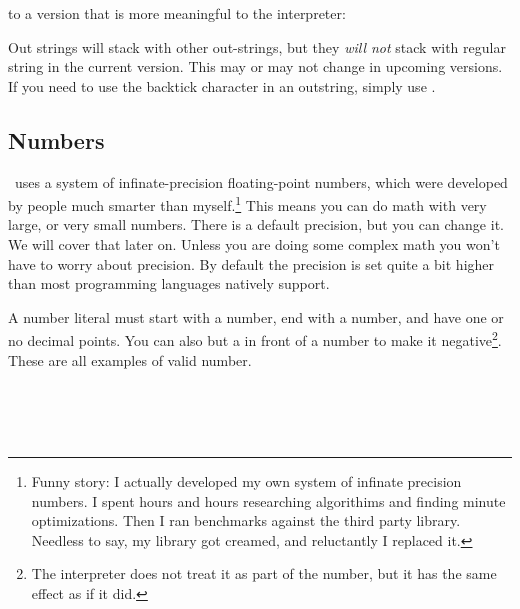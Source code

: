 \documentclass{book}
\begin{document}
\begin{SSCodeBox}
\end{SSCodeBox}

to a version that is more meaningful to the interpreter:

\begin{SSCodeBox}
\scitea{(}
\scitea{+= }
\scitea{)}
\end{SSCodeBox}

Out strings will stack with other out-strings, but they \emph{will not} stack with regular string in the current version.  This may or may not change in upcoming versions.  If you need to use the backtick character in an outstring, simply use \SSCode{\textbackslash\`{}}.



\subsection{Numbers}
\SSquared\ uses a system of infinate-precision floating-point numbers, which were developed by people much smarter than myself.\footnote{Funny story: I actually developed my own system of infinate precision numbers.  I spent hours and hours researching algorithims and finding minute optimizations.  Then I ran benchmarks against the third party library.  Needless to say, my library got creamed, and reluctantly I replaced it.}  This means you can do math with very large, or very small numbers.  There is a default precision, but you can change it. We will cover that later on. Unless you are doing some complex math you won't have to worry about precision.  By default the precision is set quite a bit higher than most programming languages natively support.

A number literal must start with a number, end with a number, and have one or no decimal points.  You can also but a \SSCode{-} in front of a number to make it negative\footnote{The interpreter does not treat it as part of the number, but it has the same effect as if it did.}.  These are all examples of valid number.

\begin{SSCodeBox}
 \\
 \\
 \\
\end{SSCodeBox}
\end{document}
